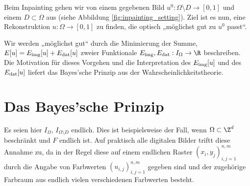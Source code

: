 \documentclass{mythesis}
\begin{document}
Beim Inpainting gehen wir von einem gegebenen Bild $u^0: \Omega \setminus D \to [0,1]$ und einem 
$D \subset \Omega$ aus (siehe Abbildung \ref{fig:inpainting_setting}). Ziel ist es nun, eine Rekonstruktion $u: \Omega \to [0,1]$ zu finden, die optisch „möglichst gut zu $u^0$ passt“.

Wir werden „möglichst gut“ durch die Minimierung der Summe,
\begin{math}
    E[u] = E_{\mathrm{img}}[u] + E_{\mathrm{dat}}[u]
\end{math}
zweier Funktionale $\Eimg, \Edat: I_\Omega \to \R$ beschreiben.
Die Motivation für dieses Vorgehen und die Interpretation des  $E_{\mathrm{img}}[u]$ und des  $E_{\mathrm{dat}}[u]$ liefert das Bayes'sche Prinzip \cite{mumford1994bayesian,chan2005variational} aus der Wahrscheinlichkeitstheorie.

%
%

\section{Das Bayes'sche Prinzip}


Es seien hier $I_\Omega$, $I_{\Omega \setminus D}$ endlich.
Dies ist beispielsweise der Fall, wenn $\Omega \subset \Z^d$ beschränkt und $F$ endlich ist.
Auf praktisch alle digitalen Bilder triftt diese Annahme zu, da in der Regel diese auf einem endlichen Raster $(x_i, y_j)_{i,j=1}^{n,m}$ durch die Angabe von Farbwerten $(u_{i,j})_{i,j=1}^{n,m}$ gegeben sind und der zugehörige Farbraum aus endlich vielen verschiedenen Farbwerten besteht.
\end{document}
